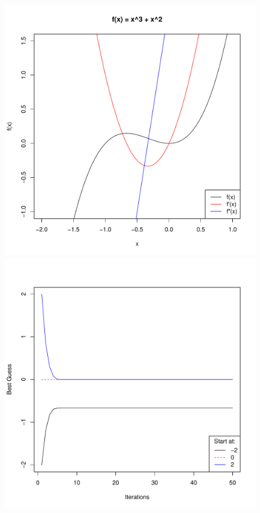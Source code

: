 \documentclass{article}
\begin{document}
\begin{figure}
	\begin{center}
		\begin{minipage}[h!]{0.49\textwidth}
			\includegraphics[width=1.0\textwidth]{poly32.pdf}
		\end{minipage}
		\begin{minipage}[h!]{0.49\textwidth}
			\includegraphics[width=1.0\textwidth]{gradConvergePoly32.pdf}
		\end{minipage}
	\end{center}
\end{figure}
\end{document}
